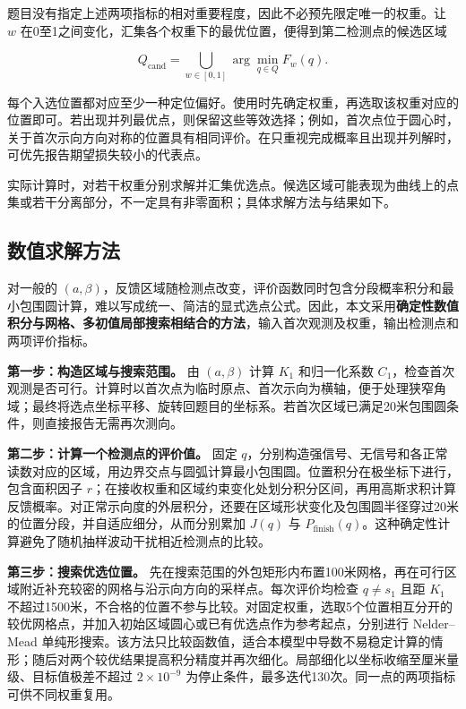 \documentclass[UTF8,a4paper,zihao=-4,fontset=none]{ctexart}
\begin{document}
题目没有指定上述两项指标的相对重要程度，因此不必预先限定唯一的权重。让 \(w\) 在0至1之间变化，汇集各个权重下的最优位置，便得到第二检测点的候选区域

\begin{equation}
 Q_{\mathrm{cand}}=\bigcup_{w\in[0,1]}\arg\min_{q\in Q}F_w(q).
\label{eq:q2-candidate-region}
\end{equation}

每个入选位置都对应至少一种定位偏好。使用时先确定权重，再选取该权重对应的位置即可。若出现并列最优点，则保留这些等效选择；例如，首次点位于圆心时，关于首次示向方向对称的位置具有相同评价。在只重视完成概率且出现并列解时，可优先报告期望损失较小的代表点。

实际计算时，对若干权重分别求解并汇集优选点。候选区域可能表现为曲线上的点集或若干分离部分，不一定具有非零面积；具体求解方法与结果如下。

\subsection{数值求解方法}

对一般的 \((a,\beta)\)，反馈区域随检测点改变，评价函数同时包含分段概率积分和最小包围圆计算，难以写成统一、简洁的显式选点公式。因此，本文采用\textbf{确定性数值积分与网格、多初值局部搜索相结合的方法}，输入首次观测及权重，输出检测点和两项评价指标。

\textbf{第一步：构造区域与搜索范围。} 由 \((a,\beta)\) 计算 \(K_1\) 和归一化系数 \(C_1\)，检查首次观测是否可行。计算时以首次点为临时原点、首次示向为横轴，便于处理狭窄角域；最终将选点坐标平移、旋转回题目的坐标系。若首次区域已满足20米包围圆条件，则直接报告无需再次测向。

\textbf{第二步：计算一个检测点的评价值。} 固定 \(q\)，分别构造强信号、无信号和各正常读数对应的区域，用边界交点与圆弧计算最小包围圆。位置积分在极坐标下进行，包含面积因子 \(r\)；在接收权重和区域约束变化处划分积分区间，再用高斯求积计算反馈概率。对正常示向度的外层积分，还要在区域形状变化及包围圆半径穿过20米的位置分段，并自适应细分，从而分别累加 \(J(q)\) 与 \(P_{\mathrm{finish}}(q)\)。这种确定性计算避免了随机抽样波动干扰相近检测点的比较。

\textbf{第三步：搜索优选位置。} 先在搜索范围的外包矩形内布置100米网格，再在可行区域附近补充较密的网格与沿示向方向的采样点。每次评价均检查 \(q\ne s_1\) 且距 \(K_1\) 不超过1500米，不合格的位置不参与比较。对固定权重，选取5个位置相互分开的较优网格点，并加入初始区域圆心或已有优选点作为参考起点，分别进行 Nelder--Mead 单纯形搜索。该方法只比较函数值，适合本模型中导数不易稳定计算的情形；随后对两个较优结果提高积分精度并再次细化。局部细化以坐标收缩至厘米量级、目标值极差不超过 \(2\times10^{-9}\) 为停止条件，最多迭代130次。同一点的两项指标可供不同权重复用。
\end{document}
